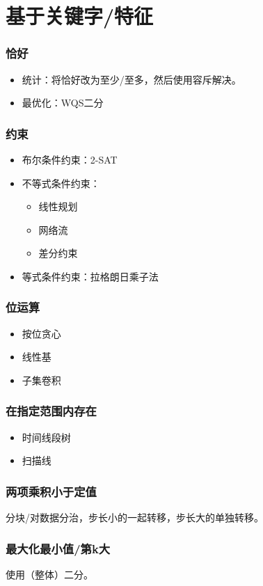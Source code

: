\section{基于关键字/特征}
\subsubsection{恰好}
\begin{itemize}
    \item 统计：将恰好改为至少/至多，然后使用容斥解决。
    \item 最优化：WQS二分
\end{itemize}
\subsubsection{约束}
\begin{itemize}
    \item 布尔条件约束：2-SAT
    \item 不等式条件约束：
    \begin{itemize}
        \item 线性规划
        \item 网络流
        \item 差分约束
    \end{itemize}
    \item 等式条件约束：拉格朗日乘子法
\end{itemize}
\subsubsection{位运算}
\begin{itemize}
    \item 按位贪心
    \item 线性基
    \item 子集卷积
\end{itemize}
\subsubsection{在指定范围内存在}
\begin{itemize}
    \item 时间线段树
    \item 扫描线
\end{itemize}
\subsubsection{两项乘积小于定值}
分块/对数据分治，步长小的一起转移，步长大的单独转移。
\subsubsection{最大化最小值/第k大}
使用（整体）二分。
